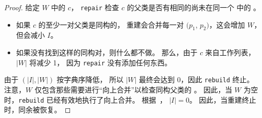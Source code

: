\begin{proof}
  
  给定 $W$ 中的 \eclass $c$，
    \texttt{repair} 检查 $c$ 的父类是否有相同的尚未在同一个 \eclass 中的 \enodes。
  \begin{itemize}
    \item 如果 $c$ 的至少一对父类是同构的，
      重建会合并每一对 $(p_{1}$, $p_{2})$，这会增加 $W$，但会减小 $I$。
    \item 如果没有找到这样的同构对，则什么都不做。
      那么，由于 $c$ 来自工作列表，$|W|$ 将减少 1，
      因为 \texttt{repair} 没有添加任何东西。
  \end{itemize}


  由于 $(|I|, |W|)$ 按字典序降低，
    所以 $|W|$ 最终会达到 $0$，因此 \texttt{rebuild} 终止。
  注意，$W$ 仅包含那些需要进行“向上合并”以检查同构父类的 \eclasses。
  因此，当 $W$ 为空时，\texttt{rebuild} 已经有效地执行了向上合并。
  根据~\citet[Chapter 7]{nelson}， $|I| = 0$。
  因此，当重建终止时，同余被恢复。

\end{proof}

